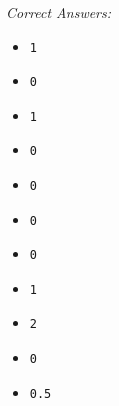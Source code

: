 \documentclass[10pt,dvips]{amsart}
\begin{document}
\par{\small{\it Correct Answers:}
\vspace{-\parskip}\begin{itemize}
\item\begin{verbatim}1\end{verbatim}
\item\begin{verbatim}0\end{verbatim}
\item\begin{verbatim}1\end{verbatim}
\item\begin{verbatim}0\end{verbatim}
\item\begin{verbatim}0\end{verbatim}
\item\begin{verbatim}0\end{verbatim}
\item\begin{verbatim}0\end{verbatim}
\item\begin{verbatim}1\end{verbatim}
\item\begin{verbatim}2\end{verbatim}
\item\begin{verbatim}0\end{verbatim}
\item\begin{verbatim}0.5\end{verbatim}
\end{itemize}}\par
% 
% 
\end{document}
